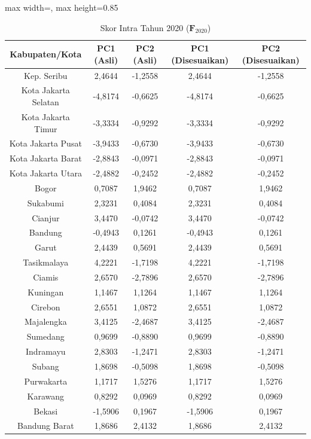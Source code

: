 \begin{table}[H]
\centering
\caption{Skor Intra Tahun 2020 ($\mathbf{F}_{2020}$)} \label{tab:app2skor_intra_2020}
\begin{adjustbox}{max width=\textwidth, max height=0.85\textheight}
\begin{tabular}{|c|c|c|c|c|}
\hline
\textbf{Kabupaten/Kota} & \textbf{PC1 (Asli)} & \textbf{PC2 (Asli)} & \textbf{PC1 (Disesuaikan)} & \textbf{PC2 (Disesuaikan)} \\
\hline
Kep. Seribu & 2,4644 & -1,2558 & 2,4644 & -1,2558 \\
Kota Jakarta Selatan & -4,8174 & -0,6625 & -4,8174 & -0,6625 \\
Kota Jakarta Timur & -3,3334 & -0,9292 & -3,3334 & -0,9292 \\
Kota Jakarta Pusat & -3,9433 & -0,6730 & -3,9433 & -0,6730 \\
Kota Jakarta Barat & -2,8843 & -0,0971 & -2,8843 & -0,0971 \\
Kota Jakarta Utara & -2,4882 & -0,2452 & -2,4882 & -0,2452 \\
Bogor & 0,7087 & 1,9462 & 0,7087 & 1,9462 \\
Sukabumi & 2,3231 & 0,4084 & 2,3231 & 0,4084 \\
Cianjur & 3,4470 & -0,0742 & 3,4470 & -0,0742 \\
Bandung & -0,4943 & 0,1261 & -0,4943 & 0,1261 \\
Garut & 2,4439 & 0,5691 & 2,4439 & 0,5691 \\
Tasikmalaya & 4,2221 & -1,7198 & 4,2221 & -1,7198 \\
Ciamis & 2,6570 & -2,7896 & 2,6570 & -2,7896 \\
Kuningan & 1,1467 & 1,1264 & 1,1467 & 1,1264 \\
Cirebon & 2,6551 & 1,0872 & 2,6551 & 1,0872 \\
Majalengka & 3,4125 & -2,4687 & 3,4125 & -2,4687 \\
Sumedang & 0,9699 & -0,8890 & 0,9699 & -0,8890 \\
Indramayu & 2,8303 & -1,2471 & 2,8303 & -1,2471 \\
Subang & 1,8698 & -0,5098 & 1,8698 & -0,5098 \\
Purwakarta & 1,1717 & 1,5276 & 1,1717 & 1,5276 \\
Karawang & 0,8292 & 0,0969 & 0,8292 & 0,0969 \\
Bekasi & -1,5906 & 0,1967 & -1,5906 & 0,1967 \\
Bandung Barat & 1,8686 & 2,4132 & 1,8686 & 2,4132 \\

\end{tabular}
\end{adjustbox}
\end{table}
